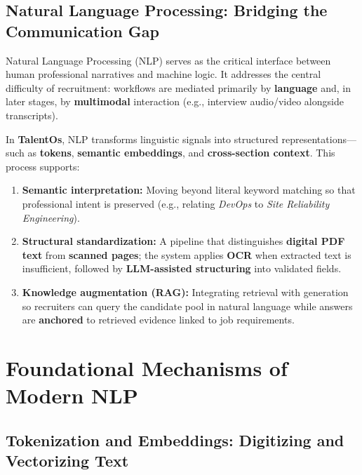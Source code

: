 \subsection{Natural Language Processing: Bridging the Communication Gap}
\label{sec:ch4:nlp_bridge}

Natural Language Processing (NLP) serves as the critical interface between human professional narratives and machine logic. It addresses the central difficulty of recruitment: workflows are mediated primarily by \textbf{language} and, in later stages, by \textbf{multimodal} interaction (e.g., interview audio/video alongside transcripts).

In \textbf{TalentOs}, NLP transforms linguistic signals into structured representations—such as \textbf{tokens}, \textbf{semantic embeddings}, and \textbf{cross-section context}. This process supports:

\begin{enumerate}
    \item \textbf{Semantic interpretation:} Moving beyond literal keyword matching so that professional intent is preserved (e.g., relating \textit{DevOps} to \textit{Site Reliability Engineering}).

    \item \textbf{Structural standardization:} A pipeline that distinguishes \textbf{digital PDF text} from \textbf{scanned pages}; the system applies \textbf{OCR} when extracted text is insufficient, followed by \textbf{LLM-assisted structuring} into validated fields.

    \item \textbf{Knowledge augmentation (RAG):} Integrating retrieval with generation so recruiters can query the candidate pool in natural language while answers are \textbf{anchored} to retrieved evidence linked to job requirements.
\end{enumerate}

\section{Foundational Mechanisms of Modern NLP}
\label{sec:ch4:foundational_nlp}

\subsection{Tokenization and Embeddings: Digitizing and Vectorizing Text}
\label{sec:ch4:tokenization_embeddings}

